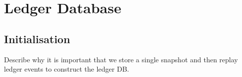 \chapter{Ledger Database}
\label{ledgerdb}

\section{Initialisation}
\label{ledgerdb:initialisation}

Describe why it is important that we store a single snapshot and then replay
ledger events to construct the ledger DB.
